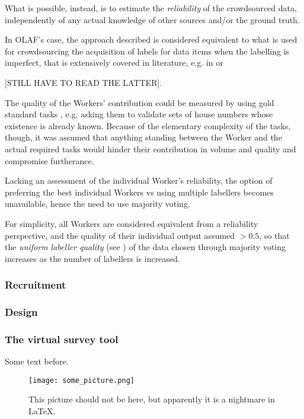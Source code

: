         What is possible, instead, is to estimate the \textit{reliability} of the crowdsourced data, independently of any actual knowledge of other sources and/or the ground truth. 
        
        In OLAF's case, the approach described is considered equivalent to what is used for crowdsourcing the acquisition of labels for data items when the labelling is imperfect, that is extensively covered in literature, e.g. in \cite{sheng2008get} or \cite{Welinder:2010vkb}{[STILL HAVE TO READ THE LATTER{]}. 
        
        The quality of the Workers' contribution could be measured by using gold standard tasks \cite{Oleson:2011tx}, e.g. asking them to validate sets of house numbers whose existence is already known. Because of the elementary complexity of the tasks, though, it was assumed that anything standing between the Worker and the actual required tasks would hinder their contribution in volume and quality and compromise furtherance.
        
        Lacking an assessment of the individual Worker's reliability, the option of preferring the best individual Workers vs using multiple labellers becomes unavailable, hence the need to use majority voting. 
        
        For simplicity, all Workers are considered equivalent from a reliability perspective, and the quality of their individual output assumed $ > 0.5 $, so that the \textit{uniform labeller quality} (see \cite{sheng2008get}) of the data chosen through majority voting increases as the number of labellers is increased.
    
    \subsubsection{Recruitment}
    \subsubsection{Design}
    \subsubsection{The virtual survey tool}
    
        Some text before.
        
        \begin{figure*}
        	\texttt{[image: some\_picture.png]}
        	\caption{This picture should not be here, but apparently it is a nightmare in LaTeX.}
        	\label{fig:some_figure}
        \end{figure*}
        
}
